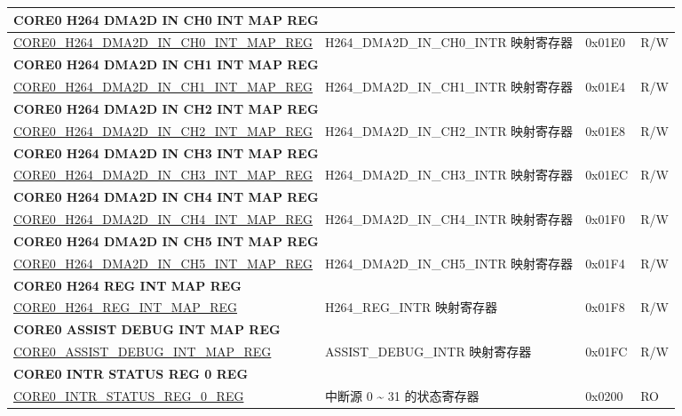 \begin{longtable}{ | p{8.7cm} | p{6.2cm} | p{1.3cm} | p{1cm} | }
\multicolumn{4}{|l|}{\textbf{CORE0 H264 DMA2D IN CH0 INT MAP REG}} \\ \hline
\hyperref[regdesc:CORE0H264DMA2DINCH0INTMAPREG]{CORE0\_H264\_DMA2D\_IN\_CH0\_INT\_MAP\_REG} & H264\_DMA2D\_IN\_CH0\_INTR 映射寄存器 & 0x01E0 & R/W \\ \hline
\multicolumn{4}{|l|}{\textbf{CORE0 H264 DMA2D IN CH1 INT MAP REG}} \\ \hline
\hyperref[regdesc:CORE0H264DMA2DINCH1INTMAPREG]{CORE0\_H264\_DMA2D\_IN\_CH1\_INT\_MAP\_REG} & H264\_DMA2D\_IN\_CH1\_INTR 映射寄存器 & 0x01E4 & R/W \\ \hline
\multicolumn{4}{|l|}{\textbf{CORE0 H264 DMA2D IN CH2 INT MAP REG}} \\ \hline
\hyperref[regdesc:CORE0H264DMA2DINCH2INTMAPREG]{CORE0\_H264\_DMA2D\_IN\_CH2\_INT\_MAP\_REG} & H264\_DMA2D\_IN\_CH2\_INTR 映射寄存器 & 0x01E8 & R/W \\ \hline
\multicolumn{4}{|l|}{\textbf{CORE0 H264 DMA2D IN CH3 INT MAP REG}} \\ \hline
\hyperref[regdesc:CORE0H264DMA2DINCH3INTMAPREG]{CORE0\_H264\_DMA2D\_IN\_CH3\_INT\_MAP\_REG} & H264\_DMA2D\_IN\_CH3\_INTR 映射寄存器 & 0x01EC & R/W \\ \hline
\multicolumn{4}{|l|}{\textbf{CORE0 H264 DMA2D IN CH4 INT MAP REG}} \\ \hline
\hyperref[regdesc:CORE0H264DMA2DINCH4INTMAPREG]{CORE0\_H264\_DMA2D\_IN\_CH4\_INT\_MAP\_REG} & H264\_DMA2D\_IN\_CH4\_INTR 映射寄存器 & 0x01F0 & R/W \\ \hline
\multicolumn{4}{|l|}{\textbf{CORE0 H264 DMA2D IN CH5 INT MAP REG}} \\ \hline
\hyperref[regdesc:CORE0H264DMA2DINCH5INTMAPREG]{CORE0\_H264\_DMA2D\_IN\_CH5\_INT\_MAP\_REG} & H264\_DMA2D\_IN\_CH5\_INTR 映射寄存器 & 0x01F4 & R/W \\ \hline
\multicolumn{4}{|l|}{\textbf{CORE0 H264 REG INT MAP REG}} \\ \hline
\hyperref[regdesc:CORE0H264REGINTMAPREG]{CORE0\_H264\_REG\_INT\_MAP\_REG} & H264\_REG\_INTR 映射寄存器 & 0x01F8 & R/W \\ \hline
\multicolumn{4}{|l|}{\textbf{CORE0 ASSIST DEBUG INT MAP REG}} \\ \hline
\hyperref[regdesc:CORE0ASSISTDEBUGINTMAPREG]{CORE0\_ASSIST\_DEBUG\_INT\_MAP\_REG} & ASSIST\_DEBUG\_INTR 映射寄存器 & 0x01FC & R/W \\ \hline
\multicolumn{4}{|l|}{\textbf{CORE0 INTR STATUS REG 0 REG}} \\ \hline
\hyperref[regdesc:CORE0INTRSTATUSREG0REG]{CORE0\_INTR\_STATUS\_REG\_0\_REG} & 中断源 0 \~{} 31 的状态寄存器 & 0x0200 & RO \\ \hline

\end{longtable}
